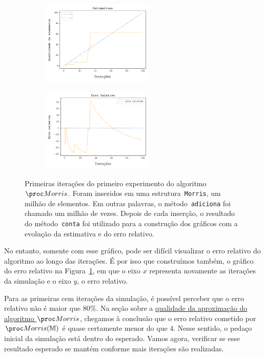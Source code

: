 \begin{figure}[h]
  \centering
  \begin{subfigure}{.5\textwidth}
    \centering
    \includegraphics[width=\linewidth, height=4cm]{figuras/morris_first.png}
  \end{subfigure}%
  \begin{subfigure}{.5\textwidth}
    \centering
    \includegraphics[width=\linewidth, height=4cm]{figuras/morris_erro_first.png}
  \end{subfigure}
  \caption{Primeiras iterações do primeiro experimento do algoritmo~$\Morris$. Foram inseridos em uma 
  estrutura~\texttt{Morris}, um milhão de elementos. Em outras palavras, o método~\texttt{adiciona} foi chamado um 
  milhão de vezes. Depois de cada inserção, o resultado do método~\texttt{conta} foi utilizado para a construção dos 
  gráficos com a evolução da estimativa e do erro relativo.}
  \label{fig:morris:first}
\end{figure}

No entanto, somente com esse gráfico, pode ser difícil visualizar o erro relativo do algoritmo ao longo das iterações. 
É por isso que construímos também, o gráfico do erro relativo na Figura~\ref{fig:morris:first}, em que o eixo $x$ 
representa novamente as iterações da simulação e o eixo $y$, o erro relativo.


Para as primeiras cem iterações da simulação, é possível perceber que o erro relativo não é maior que $80\%$. Na seção 
sobre a \hyperref[sec:morris:analysis]{qualidade da aproximação do algoritmo $\Morris$}, chegamos à conclusão que o erro 
relativo cometido por $\Morris(\Mbb)$ é quase certamente menor do que 4. Nesse sentido, o pedaço inicial da simulação 
está dentro do esperado. Vamos agora, verificar se esse resultado esperado se mantém conforme mais iterações são 
realizadas.

